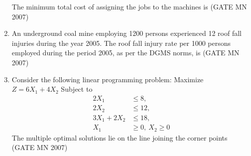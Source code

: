 \documentclass[journal]{IEEEtran}
\begin{document}
\begin{enumerate}
The minimum total cost of assigning the jobs to the machines is  
\hfill (GATE MN 2007)
\begin{enumerate}
\end{enumerate}


\item An underground coal mine employing 1200 persons experienced 12 roof fall injuries during the year 2005. The roof fall injury rate per 1000 persons employed during the period 2005, as per the DGMS norms, is  
	\hfill (GATE MN 2007)
\begin{enumerate}
\end{enumerate}


\item Consider the following linear programming problem:  
Maximize $Z = 6X_1 + 4X_2$  
Subject to
\[
\begin{aligned}
2X_1 &\le 8, \\
2X_2 &\le 12, \\
3X_1 + 2X_2 &\le 18, \\
X_1 &\ge 0, \ X_2 \ge 0
\end{aligned}
\]
The multiple optimal solutions lie on the line joining the corner points 
\hfill (GATE MN 2007)
\begin{enumerate}

\end{enumerate}



\end{enumerate}
\end{document}

